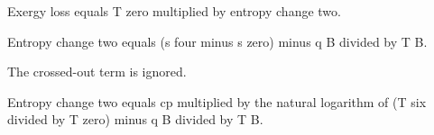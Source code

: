 Exergy loss equals T zero multiplied by entropy change two.  

Entropy change two equals (s four minus s zero) minus q B divided by T B.  

The crossed-out term is ignored.  

Entropy change two equals cp multiplied by the natural logarithm of (T six divided by T zero) minus q B divided by T B.